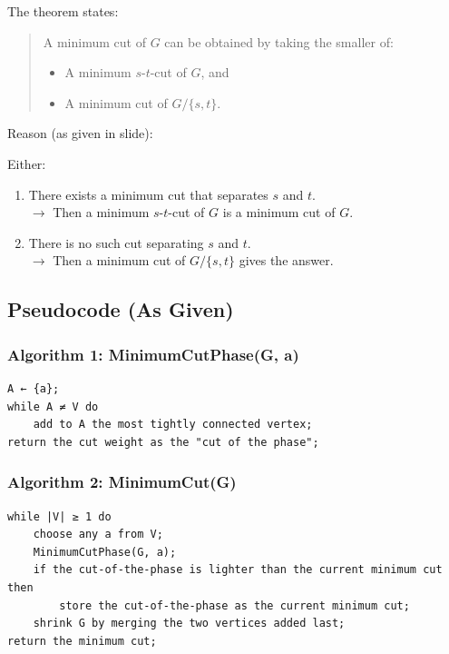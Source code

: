 \documentclass[12pt]{article}
\begin{document}
The theorem states:

\begin{quote}
A minimum cut of $G$ can be obtained by taking the smaller of:
\begin{itemize}
    \item A minimum $s$-$t$-cut of $G$, and
    \item A minimum cut of $G/\{s,t\}$.
\end{itemize}
\end{quote}

Reason (as given in slide):

Either:

\begin{enumerate}
    \item There exists a minimum cut that separates $s$ and $t$. \\
    $\rightarrow$ Then a minimum $s$-$t$-cut of $G$ is a minimum cut of $G$.

    \item There is no such cut separating $s$ and $t$. \\
    $\rightarrow$ Then a minimum cut of $G/\{s,t\}$ gives the answer.
\end{enumerate}

\subsection{Pseudocode (As Given)}

\subsubsection*{Algorithm 1: MinimumCutPhase(G, a)}

\begin{verbatim}
A ← {a};
while A ≠ V do
    add to A the most tightly connected vertex;
return the cut weight as the "cut of the phase";
\end{verbatim}

\subsubsection*{Algorithm 2: MinimumCut(G)}

\begin{verbatim}
while |V| ≥ 1 do
    choose any a from V;
    MinimumCutPhase(G, a);
    if the cut-of-the-phase is lighter than the current minimum cut then
        store the cut-of-the-phase as the current minimum cut;
    shrink G by merging the two vertices added last;
return the minimum cut;
\end{verbatim}
\end{document}
